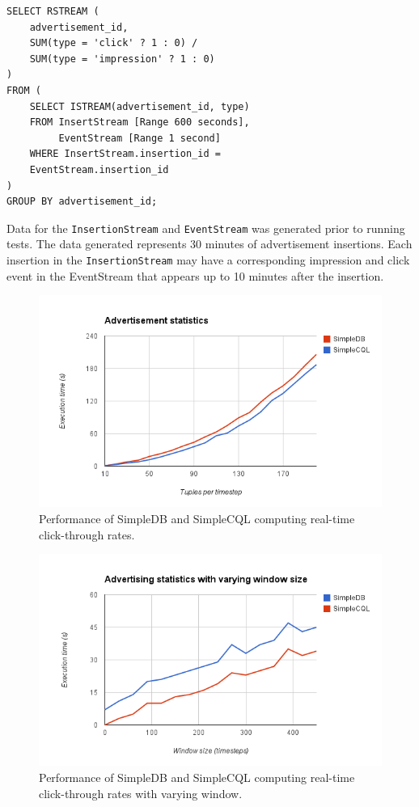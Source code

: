 \documentclass[a4paper, 10pt, conference]{IEEEconf}
\begin{document}
\begin{lstlisting}
SELECT RSTREAM (
    advertisement_id,
    SUM(type = 'click' ? 1 : 0) / 
    SUM(type = 'impression' ? 1 : 0)
)
FROM (
    SELECT ISTREAM(advertisement_id, type)
    FROM InsertStream [Range 600 seconds], 
         EventStream [Range 1 second] 
    WHERE InsertStream.insertion_id = 
    EventStream.insertion_id
) 
GROUP BY advertisement_id;
\end{lstlisting}

Data for the \texttt{InsertionStream} and \texttt{EventStream} was generated prior to running tests.  The data generated represents 30 minutes of advertisement insertions.  Each insertion in the \texttt{InsertionStream} may have a corresponding impression and click event in the EventStream that appears up to 10 minutes after the insertion.

\begin{figure}[h!]
    \centering
    \centerline{\includegraphics[totalheight=5cm]{ads.png}}
    \caption{Performance of SimpleDB and SimpleCQL computing real-time click-through rates.}
    \label{fig:ads}
\end{figure}

\begin{figure}[h!]
    \centering
    \centerline{\includegraphics[totalheight=5cm]{ads_window.png}}
    \caption{Performance of SimpleDB and SimpleCQL computing real-time click-through rates with varying window.}
    \label{fig:ads_window}
\end{figure}
\end{document}

